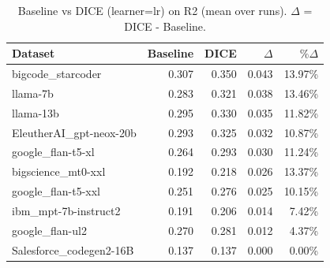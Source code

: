 \begin{table}[t]
\centering
\small
\caption{Baseline vs DICE (learner=lr) on R2 (mean over runs). $\Delta$ = DICE - Baseline.}
\label{tab:baseline-vs-dice-lr-R2}
\begin{tabular}{lrrrr}
\toprule
Dataset & Baseline & DICE & $\Delta$ & $\%\Delta$ \\
\midrule
bigcode\_starcoder & 0.307 & 0.350 & 0.043 & 13.97\% \\
llama-7b & 0.283 & 0.321 & 0.038 & 13.46\% \\
llama-13b & 0.295 & 0.330 & 0.035 & 11.82\% \\
EleutherAI\_gpt-neox-20b & 0.293 & 0.325 & 0.032 & 10.87\% \\
google\_flan-t5-xl & 0.264 & 0.293 & 0.030 & 11.24\% \\
bigscience\_mt0-xxl & 0.192 & 0.218 & 0.026 & 13.37\% \\
google\_flan-t5-xxl & 0.251 & 0.276 & 0.025 & 10.15\% \\
ibm\_mpt-7b-instruct2 & 0.191 & 0.206 & 0.014 & 7.42\% \\
google\_flan-ul2 & 0.270 & 0.281 & 0.012 & 4.37\% \\
Salesforce\_codegen2-16B & 0.137 & 0.137 & 0.000 & 0.00\% \\
\bottomrule
\end{tabular}
\end{table}